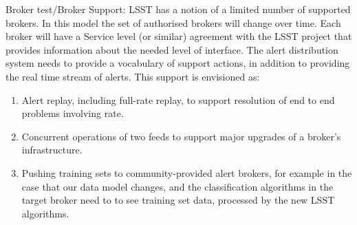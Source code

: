 Broker test/Broker Support:  LSST has a notion of a limited number of supported brokers.  In this model the set of authorised brokers will change over time.  Each broker will have a Service level (or similar) agreement with the LSST project that provides information about the needed level of interface. The alert distribution system needs to provide a vocabulary of support actions, in addition to providing the real time stream of alerts. This support is envisioned as:

\begin{enumerate}

\item Alert replay, including full-rate replay, to support resolution of end to end problems involving rate. 

\item Concurrent operations of two feeds to support major upgrades of a broker’s infrastructure. 

\item Pushing training sets to community-provided alert brokers, for example in the case that our data model changes, and the classification algorithms in the target broker need to to see training set data, processed by the new LSST algorithms.

\end{enumerate}
